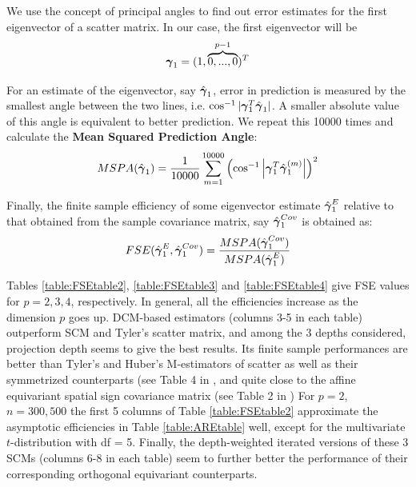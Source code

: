 \documentclass[fleqn,12pt]{article}
\begin{document}
We use the concept of principal angles \citep{miao92} to find out error estimates for the first eigenvector of a scatter matrix. In our case, the first eigenvector will be
$$ {\boldsymbol{\gamma}}_1 = (1,\overbrace{0,...,0}^{p-1})^T $$

For an estimate of the eigenvector, say $\hat{{\boldsymbol{\gamma}}}_1$, error in prediction is measured by the smallest angle between the two lines, i.e. $ \cos^{-1} | {\boldsymbol{\gamma}}_1^T \hat{{\boldsymbol{\gamma}}}_1 | $. A smaller absolute value of this angle is equivalent to better prediction. We repeat this 10000 times and calculate the \textbf{Mean Squared Prediction Angle}:
$$ MSPA(\hat {{\boldsymbol{\gamma}}}_1) = \frac{1}{10000} \sum_{m=1}^{10000} \left( \cos^{-1} \left|{\boldsymbol{\gamma}}_1^T \hat{{\boldsymbol{\gamma}}}^{(m)}_1 \right| \right)^2 $$

Finally, the finite sample efficiency of some eigenvector estimate $\hat{{\boldsymbol{\gamma}}}^E_1$ relative to that obtained from the sample covariance matrix, say $\hat{{\boldsymbol{\gamma}}}^{Cov}_1$ is obtained as:
$$ FSE(\hat{{\boldsymbol{\gamma}}}^E_1, \hat{{\boldsymbol{\gamma}}}^{Cov}_1) = \frac{MSPA(\hat{{\boldsymbol{\gamma}}}^{Cov}_1)}{MSPA(\hat{{\boldsymbol{\gamma}}}^E_1)} $$

Tables \ref{table:FSEtable2}, \ref{table:FSEtable3} and \ref{table:FSEtable4} give FSE values for $p=2,3,4$, respectively. In general, all the efficiencies increase as the dimension $p$ goes up. DCM-based estimators (columns 3-5 in each table) outperform SCM and Tyler's scatter matrix, and among the 3 depths considered, projection depth seems to give the best results. Its finite sample performances are better than Tyler's and Huber's M-estimators of scatter as well as their symmetrized counterparts (see Table 4 in \cite{sirkia07}, and quite close to the affine equivariant spatial sign covariance matrix (see Table 2 in \cite{ollilia03}) For $p=2$, $n=300, 500$ the first 5 columns of Table \ref{table:FSEtable2} approximate the asymptotic efficiencies in Table \ref{table:AREtable} well, except for the multivariate $t$-distribution with df = 5. Finally, the depth-weighted iterated versions of these 3 SCMs (columns 6-8 in each table) seem to further better the performance of their corresponding orthogonal equivariant counterparts.
\end{document}
